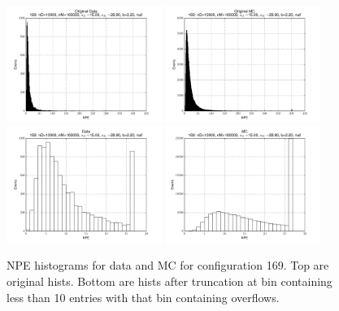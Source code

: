  \begin{figure}[htbp] \begin{center} 
\includegraphics[width=0.45\textwidth]{../FIGURES/169/FIG_Original_Data.pdf} 
\includegraphics[width=0.45\textwidth]{../FIGURES/169/FIG_Original_MC.pdf} 
\includegraphics[width=0.45\textwidth]{../FIGURES/169/FIG_Data.pdf} 
\includegraphics[width=0.45\textwidth]{../FIGURES/169/FIG_MC.pdf} 
\caption{NPE histograms for data and MC for configuration 169. Top are original hists. Bottom are hists after truncation at bin containing less than 10 entries with that bin containing overflows.} 
\label{tab:npe_169} 
\end{center} \end{figure} 
\clearpage
 